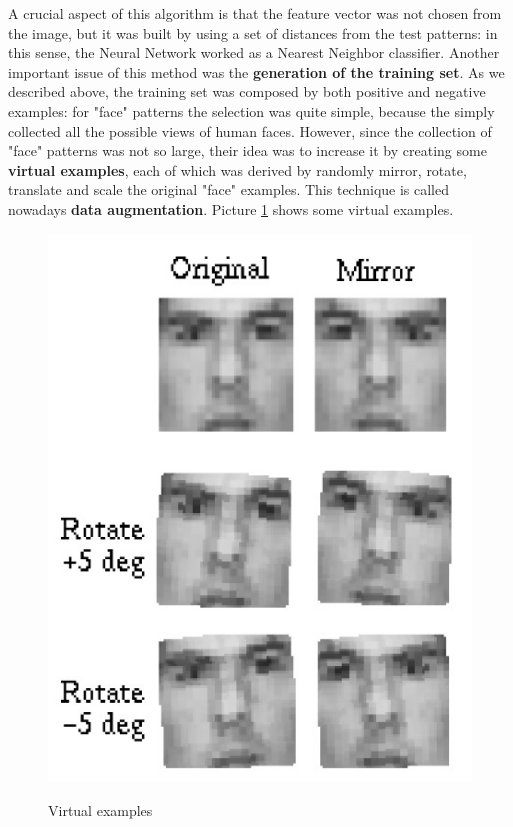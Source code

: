 A crucial aspect of this algorithm is that the feature vector was not chosen from the image, but it was built by using a set of distances from the test patterns: in this sense, the Neural Network worked as a Nearest Neighbor classifier. Another important issue of this method was the \textbf{generation of the training set}. As we described above, the training set was composed by both positive and negative examples: for "face" patterns the selection was quite simple, because the simply collected all the possible views of human faces. However, since the collection of "face" patterns was not so large, their idea was to increase it by creating some \textbf{virtual examples}, each of which was derived by randomly mirror, rotate, translate and scale the original "face" examples. This technique is called nowadays \textbf{data augmentation}. Picture \ref{poggio_virtual} shows some virtual examples.

\begin{figure}[h!]
		\centering
		\includegraphics[scale = 1.0]{img/poggio_virtual_examples.jpg}
        \label{poggio_virtual}
        \caption{Virtual examples}
\end{figure}

